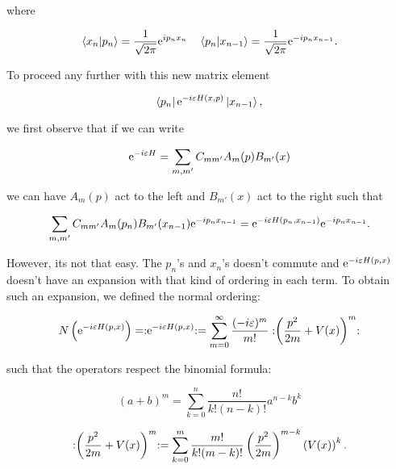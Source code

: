 where 

\begin{align*}
    \bra{x_{n}}\ket{p_{n}} = \frac{1}{\sqrt{2\pi}} \mathrm{e}^{ip_{n}x_{n}} \quad \bra{p_{n}}\ket{x_{n-1}} = \frac{1}{\sqrt{2\pi}} \mathrm{e}^{-ip_{n}x_{n-1}}.
\end{align*}

To proceed any further with this new matrix element 

\begin{equation*}
    \bra{p_{n}}\mathrm{e}^{-i\varepsilon H(x, p)}\ket{x_{n-1}},
\end{equation*}

we first observe that if we can write 

\begin{equation*}
    \mathrm{e}^{-i\varepsilon H} = \sum_{m, m'} C_{mm'} A_{m}(p) B_{m'}(x)
\end{equation*}

we can have $A_{m}(p)$ act to the left and $B_{m'}(x)$ act to the right such that 

\begin{equation*}
    \sum_{m, m'} C_{mm'} A_{m}(p_{n}) B_{m'}(x_{n-1})\mathrm{e}^{-ip_{n}x_{n-1}} = \mathrm{e}^{-i \varepsilon H(p_{n}, x_{n-1})} \mathrm{e}^{-ip_{n}x_{n-1}}. 
\end{equation*}

However, its not that easy. The $p_{n}$'s and $x_{n}$'s doesn't commute and $\mathrm{e}^{-i\varepsilon H(p,x)}$ doesn't have an expansion with that kind of ordering in each term. To obtain such an expansion, we defined the normal ordering: 

\begin{equation}
    N\left(\mathrm{e}^{-i\varepsilon H(p,x)} \right) = :\mathrel{\mathrm{e}^{-i\varepsilon H(p,x)}}: = \sum_{m = 0}^{\infty} \frac{(-i\varepsilon)^{m}}{m!} :\mathrel{\left( \frac{p^{2}}{2m} + V(x)\right)^{m}}:
\end{equation}

such that the operators respect the binomial formula: 

\begin{equation*}
    (a + b)^{m} = \sum_{k = 0}^{n} \frac{n!}{k!(n-k)!}a^{n - k}b^{k}
\end{equation*}

\begin{equation*}
    :\mathrel{\left( \frac{p^{2}}{2m} + V(x)\right)^{m}}: = \sum_{k = 0}^{m} \frac{m!}{k! (m - k)!} \left(\frac{p^{2}}{2m}\right)^{m - k} \left(V(x)\right)^{k}.
\end{equation*}

